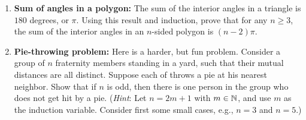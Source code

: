 \begin{enumerate}
\item \textbf{Sum of angles in a polygon:}
The sum of the interior angles in a triangle is $180$ degrees, or $\pi$.
Using this result and induction, prove that for any $n\ge3$, the sum of
the interior angles in an $n$-sided polygon is $(n-2)\pi$.

%
%
%
%
%
%
%



\item \textbf{Pie-throwing problem:}
Here is a harder, but fun problem.  Consider a group of $n$ fraternity members
standing in a yard, such that their mutual distances are all distinct.  Suppose
each of throws a pie at his nearest neighbor.  Show that if $n$ is odd, then
there is one person in the group who does not get hit by a pie. (\emph{Hint}: Let
$n=2m+1$ with $m\in\mathbb{N}$, and use $m$ as the induction variable. Consider first
some small cases, e.g., $n=3$ and $n=5$.)


\end{enumerate}
